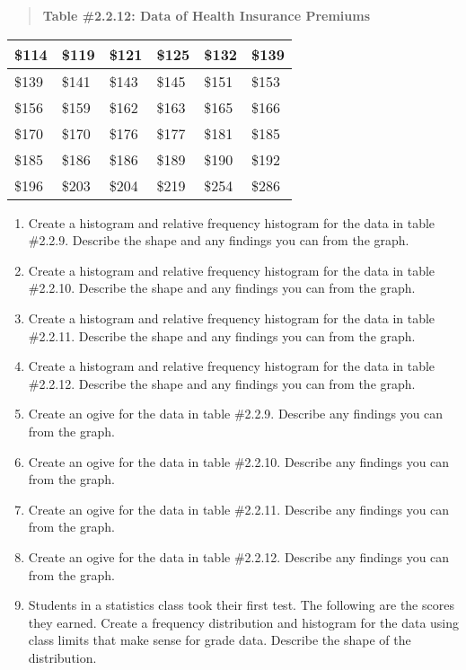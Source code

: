 \documentclass[]{book}
\begin{document}
\begin{quote}
\textbf{Table \#2.2.12: Data of Health Insurance Premiums}
\end{quote}

\begin{longtable}[]{@{}llllll@{}}
\toprule
\$114 & \$119 & \$121 & \$125 & \$132 & \$139\tabularnewline
\midrule
\endhead
\$139 & \$141 & \$143 & \$145 & \$151 & \$153\tabularnewline
\$156 & \$159 & \$162 & \$163 & \$165 & \$166\tabularnewline
\$170 & \$170 & \$176 & \$177 & \$181 & \$185\tabularnewline
\$185 & \$186 & \$186 & \$189 & \$190 & \$192\tabularnewline
\$196 & \$203 & \$204 & \$219 & \$254 & \$286\tabularnewline
\bottomrule
\end{longtable}

\begin{enumerate}
\def\labelenumi{\arabic{enumi}.}
\setcounter{enumi}{4}
\item
  Create a histogram and relative frequency histogram for the data in
  table \#2.2.9. Describe the shape and any findings you can from the
  graph.
\item
  Create a histogram and relative frequency histogram for the data in
  table \#2.2.10. Describe the shape and any findings you can from the
  graph.
\item
  Create a histogram and relative frequency histogram for the data in
  table \#2.2.11. Describe the shape and any findings you can from the
  graph.
\item
  Create a histogram and relative frequency histogram for the data in
  table \#2.2.12. Describe the shape and any findings you can from the
  graph.
\item
  Create an ogive for the data in table \#2.2.9. Describe any findings
  you can from the graph.
\item
  Create an ogive for the data in table \#2.2.10. Describe any
  findings you can from the graph.
\item
  Create an ogive for the data in table \#2.2.11. Describe any
  findings you can from the graph.
\item
  Create an ogive for the data in table \#2.2.12. Describe any
  findings you can from the graph.
\item
  Students in a statistics class took their first test. The following
  are the scores they earned. Create a frequency distribution and
  histogram for the data using class limits that make sense for grade
  data. Describe the shape of the distribution.
\end{enumerate}
\end{document}
